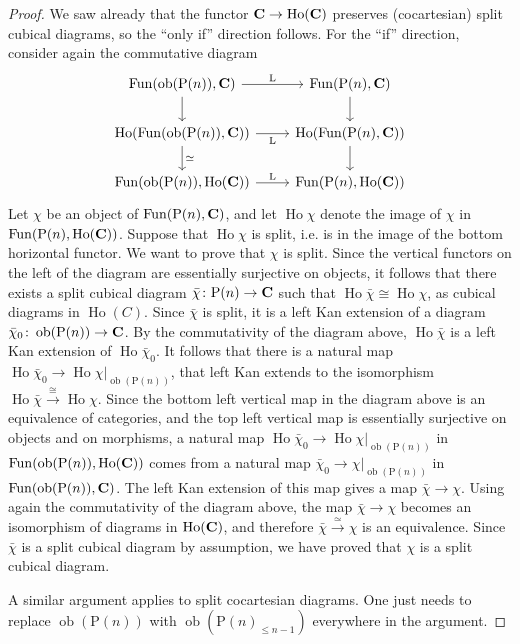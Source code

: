 \documentclass[psamsfonts]{amsart}
\theoremstyle{plain}
\theoremstyle{definition}
\theoremstyle{remark}
\newcommand{\catname}[1]{{\normalfont\textbf{#1}}}
\newcommand{\ob}{\operatorname{ob}}
\newcommand{\lkan}{\mathrm{L}}
\newcommand{\power}{\mathrm{P}}
\DeclareMathOperator{\fun}{Fun}
\DeclareMathOperator{\ho}{Ho}
\begin{document}
\begin{proof}
We saw already that the functor $\catname{C}\to \ho(\catname{C})$ preserves (cocartesian) split cubical diagrams, so the ``only if'' direction follows. For the ``if'' direction, consider again the commutative diagram
\[\label{eq:square of cubes}
\begin{tikzcd}
\fun(\ob(\power(n)), \catname{C}) & \fun(\power(n), \catname{C}) \\
	\ho(\fun(\ob(\power(n)), \catname{C})) & \ho(\fun(\power(n), \catname{C})) \\
	{\fun(\ob(\power(n)), \ho(\catname{C}))} & {\fun(\power(n), \ho(\catname{C}))}
	\arrow["\lkan", from=1-1, to=1-2]
	\arrow[from=1-1, to=2-1]
	\arrow[from=2-2, to=3-2]
	\arrow["\simeq", from=2-1, to=3-1]
	\arrow[from=1-2, to=2-2]
	\arrow["\lkan"', from=2-1, to=2-2]
	\arrow["\lkan", from=3-1, to=3-2]
\end{tikzcd}
\]
Let $\chi$ be an object of $\fun(\power(n), \catname{C})$, and let $\ho \chi$ denote the image of $\chi$ in $ \fun(\power(n), \ho(\catname{C}))$. Suppose that $\ho\chi$ is split, i.e. is in the image of the bottom horizontal functor. We want to prove that $\chi$ is split. Since the vertical functors on the left of the diagram are essentially surjective on objects, it follows that there exists a split cubical diagram $\bar\chi \colon\power(n)\to \catname{C}$ such that $\ho\bar\chi\cong \ho\chi$, as cubical diagrams in $\ho(C)$. Since $\bar \chi$ is split, it is a left Kan extension of a diagram $\bar\chi_0\colon \ob(\power(n))\to \catname{C}$. By the commutativity of the diagram above, $\ho\bar\chi$ is a left Kan extension of $\ho \bar\chi_0$. It follows that there is a natural map $\ho \bar\chi_0\to \ho \chi|_{\ob(\power(n))}$, %
that left Kan extends to the isomorphism $\ho\bar \chi \xrightarrow{\cong} \ho \chi$. Since the bottom left vertical map in the diagram above is an equivalence of categories, and the top left vertical map is essentially surjective on objects and on morphisms, a natural map $\ho \bar\chi_0\to \ho \chi|_{\ob(\power(n))}$ in $\fun(\ob(\power(n)), \ho(\catname{C}))$ comes from a natural map $\bar\chi_0\to \chi|_{\ob(\power(n))}$ in $\fun(\ob(\power(n)), \catname{C})$. The left Kan extension of this map gives a map $\bar\chi \to \chi$. Using again the commutativity of the diagram above, the map $\bar\chi\to \chi$ becomes an isomorphism of diagrams in $\ho(\catname{C})$, and therefore $\bar\chi \xrightarrow{\simeq} \chi$ is an equivalence. Since $\bar\chi$ is a split cubical diagram by assumption, we have proved that $\chi$ is a split cubical diagram.

A similar argument applies to split cocartesian diagrams. One just needs to replace $\ob(\power(n))$ with $\ob(\power(n)_{\le n-1})$ everywhere in the argument.
\end{proof}
\end{document}
